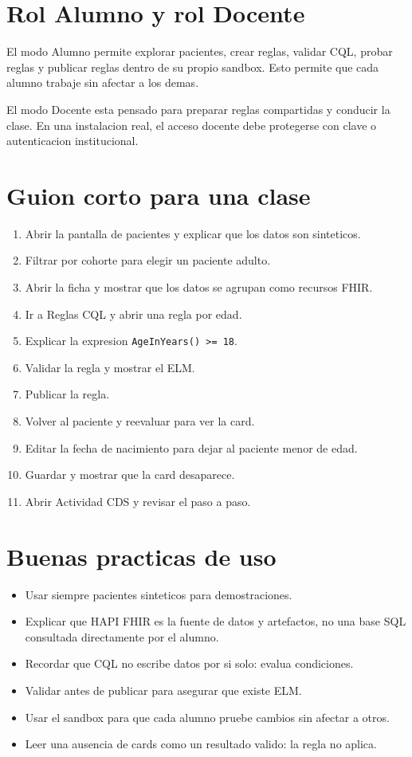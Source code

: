 \documentclass[12pt,letterpaper]{article}
\begin{document}
\section{Rol Alumno y rol Docente}

El modo Alumno permite explorar pacientes, crear reglas, validar CQL, probar
reglas y publicar reglas dentro de su propio sandbox. Esto permite que cada
alumno trabaje sin afectar a los demas.

El modo Docente esta pensado para preparar reglas compartidas y conducir la
clase. En una instalacion real, el acceso docente debe protegerse con clave o
autenticacion institucional.

\section{Guion corto para una clase}

\begin{enumerate}
  \item Abrir la pantalla de pacientes y explicar que los datos son sinteticos.
  \item Filtrar por cohorte para elegir un paciente adulto.
  \item Abrir la ficha y mostrar que los datos se agrupan como recursos FHIR.
  \item Ir a Reglas CQL y abrir una regla por edad.
  \item Explicar la expresion \texttt{AgeInYears() >= 18}.
  \item Validar la regla y mostrar el ELM.
  \item Publicar la regla.
  \item Volver al paciente y reevaluar para ver la card.
  \item Editar la fecha de nacimiento para dejar al paciente menor de edad.
  \item Guardar y mostrar que la card desaparece.
  \item Abrir Actividad CDS y revisar el paso a paso.
\end{enumerate}

\section{Buenas practicas de uso}

\begin{itemize}
  \item Usar siempre pacientes sinteticos para demostraciones.
  \item Explicar que HAPI FHIR es la fuente de datos y artefactos, no una base
  SQL consultada directamente por el alumno.
  \item Recordar que CQL no escribe datos por si solo: evalua condiciones.
  \item Validar antes de publicar para asegurar que existe ELM.
  \item Usar el sandbox para que cada alumno pruebe cambios sin afectar a otros.
  \item Leer una ausencia de cards como un resultado valido: la regla no aplica.
\end{itemize}
\end{document}
